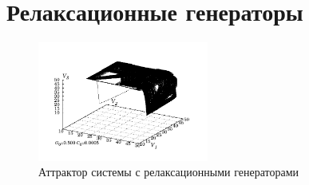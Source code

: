 
\FloatBarrier
\section{Релаксационные генераторы}



\begin{figure}[htb!]
\centerline{\includegraphics[width=0.5\textwidth]{p/cha/relax_phase3_0500.pdf} }
\caption{Аттрактор системы с релаксационными генераторами}
\label{atu:f:relax_phase3}
\end{figure}



